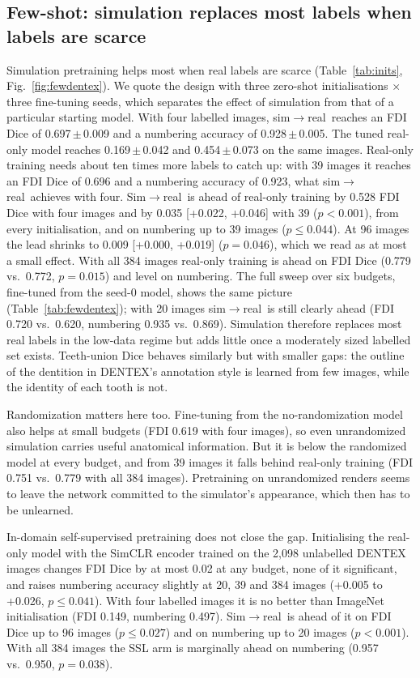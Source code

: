 \documentclass[preprint,12pt]{elsarticle}
\newcommand{\sr}{sim$\to$real}
\newcommand{\Sr}{Sim$\to$real}
\newcommand{\pmsd}[2]{#1\,$\pm$\,#2}
\begin{document}
\subsection{Few-shot: simulation replaces most labels when labels are scarce}
Simulation pretraining helps most when real labels are scarce (Table~\ref{tab:inits}, Fig.~\ref{fig:fewdentex}).
We quote the design with three zero-shot initialisations $\times$ three fine-tuning seeds, which separates the effect
of simulation from that of a particular starting model. With four labelled images, \sr\ reaches an FDI Dice of
\pmsd{0.697}{0.009} and a numbering accuracy of \pmsd{0.928}{0.005}. The tuned real-only model reaches
\pmsd{0.169}{0.042} and \pmsd{0.454}{0.073} on the same images. Real-only training needs about ten times more labels to
catch up: with 39 images it reaches an FDI Dice of 0.696 and a numbering accuracy of 0.923, what \sr\ achieves with
four. \Sr\ is ahead of real-only training by 0.528 FDI Dice with four images and by 0.035 [+0.022, +0.046] with 39
($p < 0.001$), from every initialisation, and on numbering up to 39 images ($p \leq 0.044$). At 96 images the lead
shrinks to 0.009 [+0.000, +0.019] ($p = 0.046$), which we read as at most a small effect. With all 384 images
real-only training is ahead on FDI Dice (0.779 vs.\ 0.772, $p = 0.015$) and level on numbering. The full sweep over six
budgets, fine-tuned from the seed-0 model, shows the same picture (Table~\ref{tab:fewdentex}); with 20 images \sr\ is
still clearly ahead (FDI 0.720 vs.\ 0.620, numbering 0.935 vs.\ 0.869). Simulation therefore replaces most real labels
in the low-data regime but adds little once a moderately sized labelled set exists.
Teeth-union Dice behaves similarly but with smaller gaps: the outline of the dentition in DENTEX's annotation style is
learned from few images, while the identity of each tooth is not.

Randomization matters here too. Fine-tuning from the no-randomization model also helps at small budgets (FDI 0.619 with
four images), so even unrandomized simulation carries useful anatomical information. But it is below the randomized model
at every budget, and from 39 images it falls behind real-only training (FDI 0.751 vs.\ 0.779 with all 384 images).
Pretraining on unrandomized renders seems to leave the network committed to the simulator's appearance, which then has
to be unlearned.

In-domain self-supervised pretraining does not close the gap. Initialising the real-only model with the SimCLR encoder
trained on the 2,098 unlabelled DENTEX images changes FDI Dice by at most 0.02 at any budget, none of it significant, and
raises numbering accuracy slightly at 20, 39 and 384 images (+0.005 to +0.026, $p \leq 0.041$). With four labelled
images it is no better than ImageNet initialisation (FDI 0.149, numbering 0.497). \Sr\ is ahead of it on FDI Dice up to
96 images ($p \leq 0.027$) and on numbering up to 20 images ($p < 0.001$). With all 384 images the SSL arm is marginally
ahead on numbering (0.957 vs.\ 0.950, $p = 0.038$).
\end{document}
